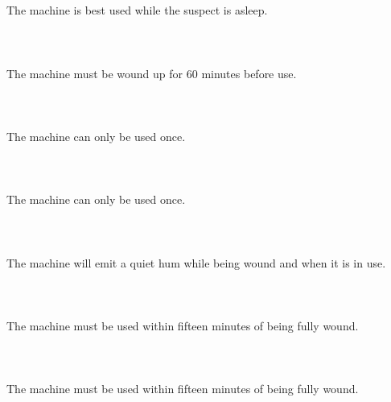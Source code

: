 \documentclass{article}
\begin{document}
    \section{}
    The machine is best used while the suspect is asleep.\\\\ 
    \newpage
    
    \section{}
    The machine must be wound up for 60 minutes before use.\\\\ 
    \newpage
    
    \section{}
    The machine can only be used once.\\\\ 
    \newpage
    
    \section{}
    The machine can only be used once.\\\\ 
    \newpage
    
    \section{}
    The machine will emit a quiet hum while being wound and when it is in use.\\\\ 
    \newpage
    
    \section{}
    The machine must be used within fifteen minutes of being fully wound.\\\\ 
    \newpage
    
    \section{}
    The machine must be used within fifteen minutes of being fully wound.\\\\ 
    \newpage
    
\end{document}

